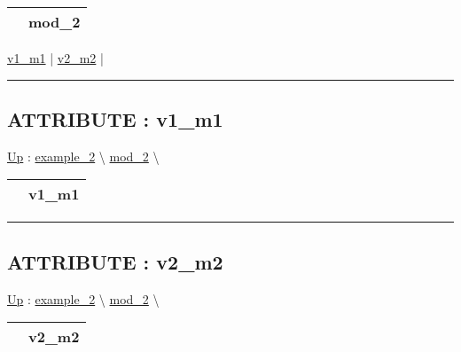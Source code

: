 {\renewcommand{\arraystretch}{1.5}
\begin{tabularx}{\textwidth}{|>{\raggedright\arraybackslash}l|X|}
\hline
\hspace{0pt} & mod\_2 \\
\hline
\end{tabularx}
}

\par


\hyperlink{ecldoc:example_2.mod_2.v1_m1}{v1\_m1}  |
\hyperlink{ecldoc:example_2.mod_2.v2_m2}{v2\_m2}  |

\rule{\linewidth}{0.5pt}

\subsection*{ATTRIBUTE : v1\_m1}
\hypertarget{ecldoc:example_2.mod_2.v1_m1}{}
\hyperlink{ecldoc:example_2.mod_2}{Up} :
\hspace{0pt} \hyperlink{ecldoc:example_2}{example_2} \textbackslash 
\hspace{0pt} \hyperlink{ecldoc:example_2.mod_2}{mod_2} \textbackslash 

{\renewcommand{\arraystretch}{1.5}
\begin{tabularx}{\textwidth}{|>{\raggedright\arraybackslash}l|X|}
\hline
\hspace{0pt} & v1\_m1 \\
\hline
\end{tabularx}
}

\par


\rule{\linewidth}{0.5pt}
\subsection*{ATTRIBUTE : v2\_m2}
\hypertarget{ecldoc:example_2.mod_2.v2_m2}{}
\hyperlink{ecldoc:example_2.mod_2}{Up} :
\hspace{0pt} \hyperlink{ecldoc:example_2}{example_2} \textbackslash 
\hspace{0pt} \hyperlink{ecldoc:example_2.mod_2}{mod_2} \textbackslash 

{\renewcommand{\arraystretch}{1.5}
\begin{tabularx}{\textwidth}{|>{\raggedright\arraybackslash}l|X|}
\hline
\hspace{0pt} & v2\_m2 \\
\hline
\end{tabularx}
}

\par


